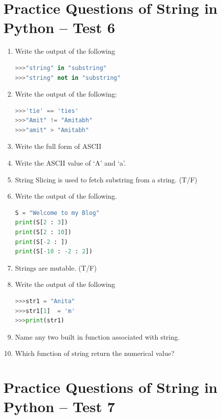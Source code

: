\documentclass[12pt,a4paper]{article}
\begin{document}
\section{Practice Questions of String in Python -- Test 6}

\begin{enumerate}[label=\textbf{Q\arabic*.}]

\item Write the output of the following
\begin{lstlisting}[language=Python]
>>>"string" in "substring"
>>>"string" not in "substring"
\end{lstlisting}

\item Write the output of the following:
\begin{lstlisting}[language=Python]
>>>'tie' == 'ties'
>>>"Amit" != "Amitabh"
>>>"amit" > "Amitabh"
\end{lstlisting}

\item Write the full form of ASCII

\item Write the ASCII value of `A' and `a'.

\item String Slicing is used to fetch substring from a string. (T/F)

\item Write the output of the following.
\begin{lstlisting}[language=Python]
S = "Welcome to my Blog"
print(S[2 : 3])
print(S[2 : 10])
print(S[-2 : ])
print(S[-10 : -2 : 2])
\end{lstlisting}

\item Strings are mutable. (T/F)

\item Write the output of the following
\begin{lstlisting}[language=Python]
>>>str1 = "Anita"
>>>str1[1]  = 'm'
>>>print(str1)
\end{lstlisting}

\item Name any two built in function associated with string.

\item Which function of string return the numerical value?

\end{enumerate}

\section{Practice Questions of String in Python -- Test 7}
\end{document}
